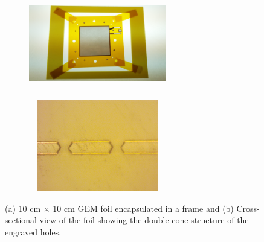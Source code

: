 \begin{figure}[!htbp]
    \centering
    \begin{subfigure}[b]{0.46\textwidth}
        \includegraphics[width=6cm, height=4cm]{figures/GEM/figures/Foil_01.png}\qquad
        \caption{ }
    \end{subfigure}
    \begin{subfigure}[b]{0.46\textwidth}
        \includegraphics[width=6cm, height=4cm]{figures/GEM/figures/double_cone.png}
        \caption{ }
    \end{subfigure}
   \caption{(a) 10 cm $\times$ 10 cm GEM foil encapsulated in a frame and (b) Cross-sectional view of the foil showing the double cone structure of the engraved holes. } \label{fig:Foil_and_Cone}
\end{figure}

